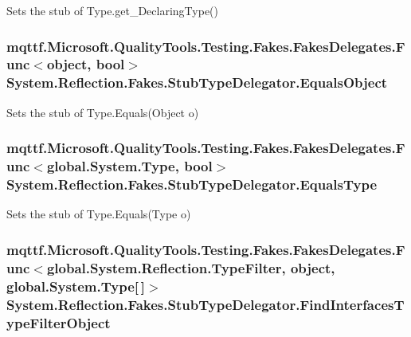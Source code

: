 Sets the stub of Type.\-get\-\_\-\-Declaring\-Type()

\hypertarget{class_system_1_1_reflection_1_1_fakes_1_1_stub_type_delegator_ae7ca48d521a2d6b18dfcf0db7111a1c1}{
\subsubsection[{Equals\-Object}]{\setlength{\rightskip}{0pt plus 5cm}mqttf.\-Microsoft.\-Quality\-Tools.\-Testing.\-Fakes.\-Fakes\-Delegates.\-Func$<$object, bool$>$ System.\-Reflection.\-Fakes.\-Stub\-Type\-Delegator.\-Equals\-Object}}\label{class_system_1_1_reflection_1_1_fakes_1_1_stub_type_delegator_ae7ca48d521a2d6b18dfcf0db7111a1c1}


Sets the stub of Type.\-Equals(\-Object o)

\hypertarget{class_system_1_1_reflection_1_1_fakes_1_1_stub_type_delegator_ad43366615f2bad2727b597736ee17afd}{
\subsubsection[{Equals\-Type}]{\setlength{\rightskip}{0pt plus 5cm}mqttf.\-Microsoft.\-Quality\-Tools.\-Testing.\-Fakes.\-Fakes\-Delegates.\-Func$<$global.\-System.\-Type, bool$>$ System.\-Reflection.\-Fakes.\-Stub\-Type\-Delegator.\-Equals\-Type}}\label{class_system_1_1_reflection_1_1_fakes_1_1_stub_type_delegator_ad43366615f2bad2727b597736ee17afd}


Sets the stub of Type.\-Equals(\-Type o)

\hypertarget{class_system_1_1_reflection_1_1_fakes_1_1_stub_type_delegator_a88bd6bf16864701725134b69f85b23fa}{
\subsubsection[{Find\-Interfaces\-Type\-Filter\-Object}]{\setlength{\rightskip}{0pt plus 5cm}mqttf.\-Microsoft.\-Quality\-Tools.\-Testing.\-Fakes.\-Fakes\-Delegates.\-Func$<$global.\-System.\-Reflection.\-Type\-Filter, object, global.\-System.\-Type\mbox{[}$\,$\mbox{]}$>$ System.\-Reflection.\-Fakes.\-Stub\-Type\-Delegator.\-Find\-Interfaces\-Type\-Filter\-Object}}\label{class_system_1_1_reflection_1_1_fakes_1_1_stub_type_delegator_a88bd6bf16864701725134b69f85b23fa}


